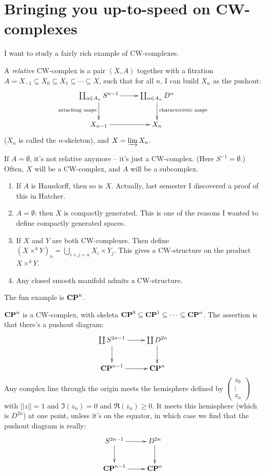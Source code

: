 \section{Bringing you up-to-speed on CW-complexes}
I want to study a fairly rich example of CW-complexes.
\begin{definition}
    A \emph{relative} CW-complex is a pair $(X,A)$ together with a fitration $A=X_{-1}\subseteq X_0\subseteq X_1\subseteq\cdots\subseteq X$, such that for all $n$, I can build $X_n$ as the pushout:
    $$
    \xymatrix{
	\coprod_{\alpha\in A_n}S^{n-1}\ar[r]\ar[d]_{\text{attaching maps}} & \coprod_{\alpha\in A_n}D^n\ar[d]^{\text{characteristic maps}}\\
	X_{n-1}\ar[r] & X_n
    }
    $$
    ($X_n$ is called the $n$-skeleton), and $X=\varinjlim X_n$.
\end{definition}
If $A=\emptyset$, it's not relative anymore -- it's just a CW-complex. (Here $S^{-1} = \emptyset$.) Often, $X$ will be a CW-complex, and $A$ will be a subcomplex.
\begin{enumerate}
    \item If $A$ is Hausdorff, then so is $X$. Actually, last semester I discovered a proof of this in Hatcher.
    \item $A=\emptyset$: then $X$ is compactly generated. This is one of the reasons I wanted to define compactly generated spaces.
    \item If $X$ and $Y$ are both CW-complexes. Then define $(X\times^k Y)_n = \bigcup_{i+j = n}X_i\times Y_j$. This gives a CW-structure on the product $X\times^k Y$.
    \item Any closed smooth manifold admits a CW-structure. 
\end{enumerate}
The fun example is $\mathbf{CP}^n$.
\begin{example}
    $\mathbf{CP}^n$ is a CW-complex, with skeleta $\mathbf{CP}^0\subseteq\mathbf{CP}^1\subseteq\cdots\subseteq \mathbf{CP}^n$. The assertion is that there's a pushout diagram:
    \begin{equation*}
	\xymatrix{
	    \coprod S^{2n-1}\ar[r]\ar[d] & \coprod D^{2n}\ar[d]\\
	    \CP^{n-1}\ar[r] & \CP^n
	    }
    \end{equation*}
    Any complex line through the origin meets the hemisphere defined by $\begin{pmatrix}z_0\\\vdots\\z_n\end{pmatrix}$ with $||z||=1$ and $\Im(z_n) = 0$ and $\Re(z_n)\geq 0$. It meets this hemisphere (which is $D^{2n}$) at one point, unless it's on the equator, in which case we find that the pushout diagram is really:
    \begin{equation*}
	\xymatrix{
	    S^{2n-1}\ar[r]\ar[d] & D^{2n}\ar[d]\\
	    \CP^{n-1}\ar[r] & \CP^n
	    }
    \end{equation*}
\end{example}
